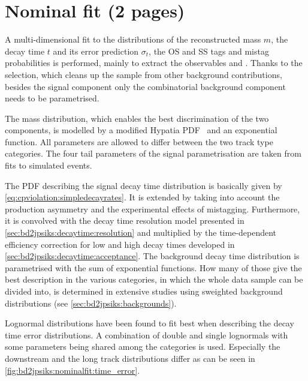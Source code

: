 
\section{Nominal fit (2 pages)}
\label{sec:bd2jpsiks:nominalfit}

A multi-dimensional fit to the distributions of the reconstructed mass $m$,
the decay time $t$ and its error prediction $\sigma_t$, the OS and SS\pion
tags and mistag probabilities is performed, mainly to extract the \CP
observables \SJpsiKS and \CJpsiKS. Thanks to the selection, which cleans up
the sample from other background contributions, besides the signal component
only the combinatorial background component needs to be parametrised.

The mass distribution, which enables the best discrimination of the two
components, is modelled by a modified Hypatia PDF~\cite{Santos:2013ky} and an
exponential function. All parameters are allowed to differ between the two
track type categories. The four tail parameters of the signal parametrisation
are taken from fits to simulated events.

The PDF describing the signal decay time distribution is basically given by
\cref{eq:cpviolation:simpledecayrates}. It is extended by taking into account
the production asymmetry and the experimental effects of mistagging.
Furthermore, it is convolved with the decay time resolution model presented in
\cref{sec:bd2jpsiks:decaytime:resolution} and multiplied by the time-dependent
efficiency correction for low and high decay times developed in
\cref{sec:bd2jpsiks:decaytime:acceptance}. The background decay time
distribution is parametrised with the sum of exponential functions. How many
of those give the best description in the various categories, in which the
whole data sample can be divided into, is determined in extensive studies
using sweighted background distributions (see
\cref{sec:bd2jpsiks:backgrounds}).

Lognormal distributions have been found to fit best when describing the decay
time error distributions. A combination of double and single lognormals with
some parameters being shared among the categories is used. Especially the
downstream and the long track distributions differ as can be seen in
\cref{fig:bd2jpsiks:nominalfit:time_error}.


